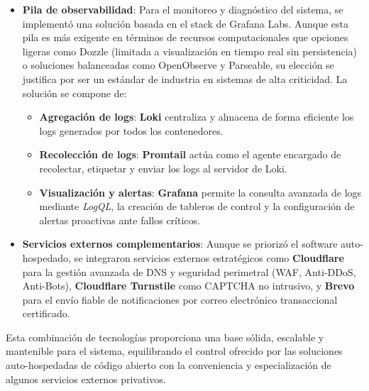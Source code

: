 \begin{itemize}
    \item \textbf{Pila de observabilidad}: Para el monitoreo y diagnóstico del sistema, se implementó una solución basada en el stack de Grafana Labs. Aunque esta pila es más exigente en términos de recursos computacionales que opciones ligeras como Dozzle (limitada a visualización en tiempo real sin persistencia) o soluciones balanceadas como OpenObserve y Parseable, su elección se justifica por ser un estándar de industria en sistemas de alta criticidad. La solución se compone de:
        \begin{itemize}
            \item \textbf{Agregación de logs}: \textbf{Loki} centraliza y almacena de forma eficiente los logs generados por todos los contenedores.
            \item \textbf{Recolección de logs}: \textbf{Promtail} actúa como el agente encargado de recolectar, etiquetar y enviar los logs al servidor de Loki.
            \item \textbf{Visualización y alertas}: \textbf{Grafana} permite la consulta avanzada de logs mediante \textit{LogQL}, la creación de tableros de control y la configuración de alertas proactivas ante fallos críticos.
        \end{itemize}

    \item \textbf{Servicios externos complementarios}: Aunque se priorizó el software auto-hospedado, se integraron servicios externos estratégicos como \textbf{Cloudflare} para la gestión avanzada de DNS y seguridad perimetral (WAF, Anti-DDoS, Anti-Bots), \textbf{Cloudflare Turnstile} como CAPTCHA no intrusivo, y \textbf{Brevo} para el envío fiable de notificaciones por correo electrónico transaccional certificado.
\end{itemize}

Esta combinación de tecnologías proporciona una base sólida, escalable y mantenible para el sistema, equilibrando el control ofrecido por las soluciones auto-hospedadas de código abierto con la conveniencia y especialización de algunos servicios externos privativos.



